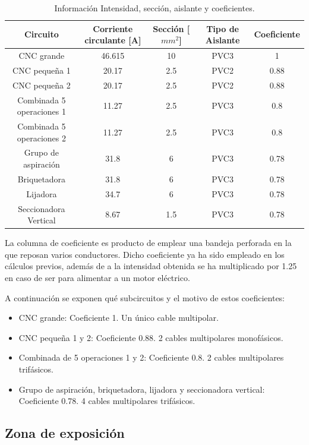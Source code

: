 \documentclass[../main.tex]{subfiles}
\begin{document}
\begin{table}[H]
    \centering
    \begin{tabular}{c|c|c|c|c}
        Circuito & Corriente circulante [A] & Sección [$mm^2$] & Tipo de Aislante & Coeficiente\\ \hline
        
        CNC grande & 46.615 & 10 & PVC3 & 1 \\
        CNC pequeña 1 & 20.17 & 2.5 & PVC2 & 0.88 \\
        CNC pequeña 2 & 20.17 & 2.5 & PVC2 & 0.88 \\
        Combinada 5 operaciones 1 & 11.27 & 2.5 & PVC3 & 0.8 \\
        Combinada 5 operaciones 2 & 11.27 & 2.5 & PVC3 & 0.8 \\
        Grupo de aspiración & 31.8 & 6 & PVC3 & 0.78 \\
        Briquetadora & 31.8 & 6 & PVC3 & 0.78 \\
        Lijadora & 34.7 & 6 & PVC3 & 0.78 \\
        Seccionadora Vertical & 8.67 & 1.5 & PVC3 & 0.78 
       
    \end{tabular}
    \caption{Información Intensidad, sección, aislante y coeficientes.}
\end{table}

La columna de coeficiente es producto de emplear una bandeja perforada en la que reposan varios conductores. Dicho coeficiente ya ha sido empleado en los cálculos previos, además de a la intensidad obtenida se ha multiplicado por 1.25 en caso de ser para alimentar a un motor eléctrico.

A continuación se exponen qué subcircuitos y el motivo de estos coeficientes:

\begin{itemize}
    \item CNC grande: Coeficiente 1. Un único cable multipolar.
    \item CNC pequeña 1 y 2: Coeficiente 0.88. 2 cables multipolares monofásicos.
    \item Combinada de 5 operaciones 1 y 2: Coeficiente 0.8. 2 cables multipolares trifásicos.
    \item Grupo de aspiración, briquetadora, lijadora y seccionadora vertical: Coeficiente 0.78. 4 cables multipolares trifásicos.
\end{itemize}

\subsection{Zona de exposición}
\end{document}
